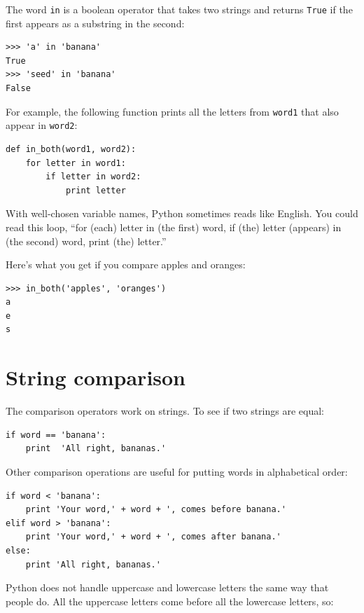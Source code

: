 \documentclass[10pt]{book}
\begin{document}

The word {\tt in} is a boolean operator that takes two strings and
returns {\tt True} if the first appears as a substring in the second:

\beforeverb
\begin{verbatim}
>>> 'a' in 'banana'
True
>>> 'seed' in 'banana'
False
\end{verbatim}
\afterverb
%
For example, the following function prints all the
letters from {\tt word1} that also appear in {\tt word2}:

\beforeverb
\begin{verbatim}
def in_both(word1, word2):
    for letter in word1:
        if letter in word2:
            print letter
\end{verbatim}
\afterverb
%
With well-chosen variable names,
Python sometimes reads like English.  You could read
this loop, ``for (each) letter in (the first) word, if (the) letter 
(appears) in (the second) word, print (the) letter.''

Here's what you get if you compare apples and oranges:

\beforeverb
\begin{verbatim}
>>> in_both('apples', 'oranges')
a
e
s
\end{verbatim}
\afterverb
%

\section{String comparison}


The comparison operators work on strings.  To see if two strings are equal:

\beforeverb
\begin{verbatim}
if word == 'banana':
    print  'All right, bananas.'
\end{verbatim}
\afterverb
%
Other comparison operations are useful for putting words in alphabetical
order:

\beforeverb
\begin{verbatim}
if word < 'banana':
    print 'Your word,' + word + ', comes before banana.'
elif word > 'banana':
    print 'Your word,' + word + ', comes after banana.'
else:
    print 'All right, bananas.'
\end{verbatim}
\afterverb
%
Python does not handle uppercase and lowercase letters the same way
that people do.  All the uppercase letters come before all the
lowercase letters, so:
\end{document}
